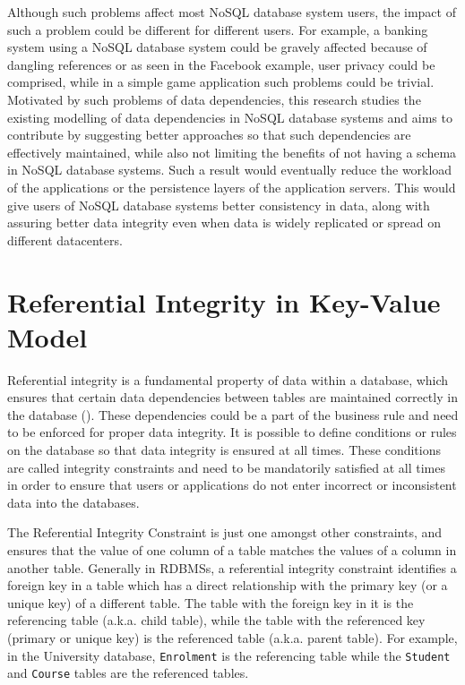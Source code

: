 Although such problems affect most \ac{NoSQL} database system users, the impact of
such a problem could be different for different users. For example, a banking
system using a \ac{NoSQL} database system could be gravely affected because of
dangling references or as seen in the Facebook example, user privacy could be
comprised, while in a simple game application such problems could be trivial.
Motivated by such problems of data dependencies, this research studies the
existing modelling of data dependencies in \ac{NoSQL} database systems and aims to
contribute by suggesting better approaches so that such dependencies are
effectively maintained, while also not limiting the benefits of not having a
schema in \ac{NoSQL} database systems. Such a result would eventually reduce the
workload of the applications or the persistence layers of the application
servers. This would give users of \ac{NoSQL} database systems better consistency in
data, along with assuring better data integrity even when data is widely
replicated or spread on different datacenters.



\section{Referential Integrity in Key-Value
Model}\label{s:referential-integrity}
 Referential integrity is a fundamental property of data within a database, which
ensures that certain data dependencies between tables are maintained correctly
in the database (). These dependencies could be a part of the
business rule and need to be enforced for proper data integrity. It is possible
to define conditions or rules on the database so that data integrity is ensured
at all times. These conditions are called integrity constraints and need to be
mandatorily satisfied at all times in order to ensure that users or applications
do not enter incorrect or inconsistent data into the databases.

The Referential Integrity Constraint is just one amongst other constraints, and
ensures that the value of one column of a table matches the values of a column
in another table. Generally in \acp{RDBMS}, a referential integrity constraint
identifies a foreign key in a table which has a direct relationship with the
primary key (or a unique key) of a different table. The table with the foreign
key in it is the referencing table (a.k.a. child table), while the table with
the referenced key (primary or unique key) is the referenced table (a.k.a.
parent table). For example, in the University database, \texttt{Enrolment} is the
referencing table while the \texttt{Student} and \texttt{Course} tables are the referenced
tables.


